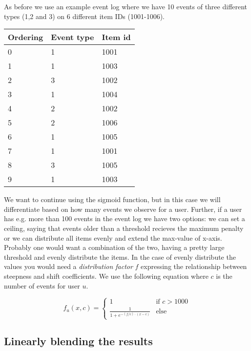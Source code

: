 As before we use an example event log where we have 10 events of three
different types (1,2 and 3) on 6 different item IDs (1001-1006).

\begin{table}
  \centering
  \label{event-log-sigmoid-count}
  \begin{tabular}{lll}
    \toprule
    Ordering & Event type & Item id \\
    \midrule
    0 & 1 & 1001 \\
    1 & 1 & 1003 \\
    2 & 3 & 1002 \\
    3 & 1 & 1004 \\
    4 & 2 & 1002 \\
    5 & 2 & 1006 \\
    6 & 1 & 1005 \\
    7 & 1 & 1001 \\
    8 & 3 & 1005 \\
    9 & 1 & 1003 \\
    \bottomrule
  \end{tabular}
\end{table}

We want to continue using the sigmoid function, but in this case we will
differentiate based on how many events we observe for a user. Further, if a
user has e.g. more than 100 events in the event log we have two options: we can
set a ceiling, saying that events older than a threshold recieves the maximum
penalty or we can distribute all items evenly and extend the max-value of
x-axis. Probably one would want a combination of the two, having a pretty large
threshold and evenly distribute the items. In the case of evenly distribute the
values you would need a \textit{distribution factor} $f$ expressing the
relationship between steepness and shift coefficients. We use the following
equation where $c$ is the number of events for user $u$.

\begin{equation}
  f_{u}(x, c) =
    \begin{cases}
      1               & \text{if } c > 1000 \\
      \frac{1}{1+e^{-(f/c) \cdot (x - c)}} & \text{else }
    \end{cases}
\end{equation}

\subsection{Linearly blending the results}

